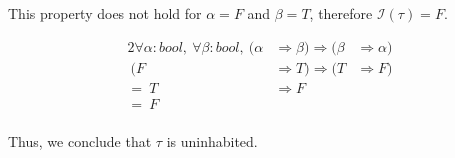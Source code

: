 \documentclass{article}
\begin{document}
\begin{enumerate}
    This property does not hold for \(\alpha = F\) and \(\beta = T\), therefore \(\mathcal{I}(\tau) = F\).

    \begin{alignat*}{2}
        \forall \alpha {:} bool,\ \forall \beta {:} bool,\ (\alpha & \Rightarrow \beta) \Rightarrow (\beta & \Rightarrow \alpha) \\
        \ (F & \Rightarrow T) \Rightarrow (T & \Rightarrow F) \\
        =\ T & \Rightarrow F \\
        =\ F \\
    \end{alignat*}

    Thus, we conclude that \(\tau\) is uninhabited.
\end{enumerate}
\end{document}
